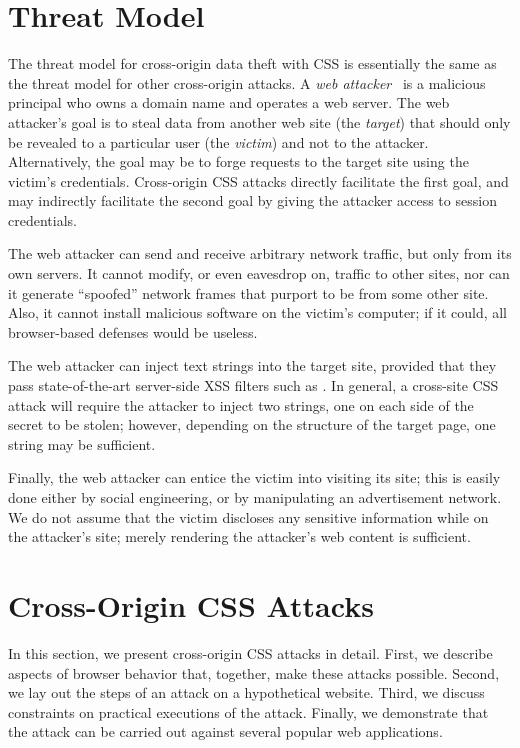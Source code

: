 \documentclass{acm_proc_article-sp}
\begin{document}
\section{Threat Model} \label{sec:threatmodel}

The threat model for cross-origin data theft with CSS is essentially
the same as the threat model for other cross-origin attacks.  A
\emph{web attacker}~\cite{jackson09thesis} is a malicious principal
who owns a domain name and operates a web server.  The web attacker's
goal is to steal data from another web site (the \emph{target}) that
should only be revealed to a particular user (the \emph{victim}) and
not to the attacker.  Alternatively, the goal may be to forge requests
to the target site using the victim's credentials.  Cross-origin CSS
attacks directly facilitate the first goal, and may indirectly
facilitate the second goal by giving the attacker access to session
credentials.

The web attacker can send and receive arbitrary network traffic, but
only from its own servers.  It cannot modify, or even eavesdrop on,
traffic to other sites, nor can it generate “spoofed” network frames
that purport to be from some other site.  Also, it cannot install
malicious software on the victim's computer; if it could, all
browser-based defenses would be useless.

The web attacker can inject text strings into the target site,
provided that they pass state-of-the-art server-side XSS filters such
as \cite{htmlpurifier}.  In general, a cross-site CSS attack will
require the attacker to inject two strings, one on each side of the
secret to be stolen; however, depending on the structure of the target
page, one string may be sufficient.

Finally, the web attacker can entice the victim into visiting its
site; this is easily done either by social engineering, or by
manipulating an advertisement network.  We do not assume that the
victim discloses any sensitive information while on the attacker's
site; merely rendering the attacker's web content is sufficient.

\section{Cross-Origin CSS Attacks} \label{sec:attacks}

In this section, we present cross-origin CSS attacks in detail.
First, we describe aspects of browser behavior that, together,
make these attacks possible.  Second, we lay out the steps of an
attack on a hypothetical website.  Third, we discuss constraints on
practical executions of the attack.  Finally, we demonstrate that the
attack can be carried out against several popular web applications.
\end{document}
